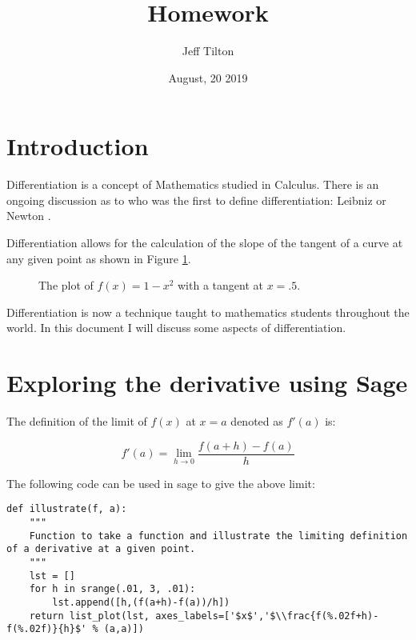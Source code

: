 \documentclass[a4paper]{article}
\title{Homework }
\author{Jeff Tilton}
\date{August, 20 2019}
\begin{document}
\maketitle

\section{Introduction}

Differentiation is a concept of Mathematics studied in Calculus. There is an ongoing discussion as to who was the first to define differentiation: Leibniz or Newton \cite{bardi2006calculus}.

Differentiation allows for the calculation of the slope of the tangent of a curve at any given point as shown in Figure \ref{exampleplot}.

\begin{figure}[!htbp]
\begin{center}
\end{center}
\caption{The plot of $f(x)=1-x^2$ with a tangent at $x=.5$.}\label{exampleplot}
\end{figure}

Differentiation is now a technique taught to mathematics students throughout the world. In this document I will discuss some aspects of differentiation.

\section{Exploring the derivative using Sage}

The definition of the limit of $f(x)$ at $x=a$ denoted as $f'(a)$ is:

\begin{equation}
f'(a) = \lim_{h\to0}\frac{f(a+h)-f(a)}{h}
\end{equation}

The following code can be used in sage to give the above limit:

\begin{verbatim}
def illustrate(f, a):
    """
    Function to take a function and illustrate the limiting definition of a derivative at a given point.
    """
    lst = []
    for h in srange(.01, 3, .01):
    	lst.append([h,(f(a+h)-f(a))/h])
    return list_plot(lst, axes_labels=['$x$','$\\frac{f(%.02f+h)-f(%.02f)}{h}$' % (a,a)])
\end{verbatim}
\end{document}
